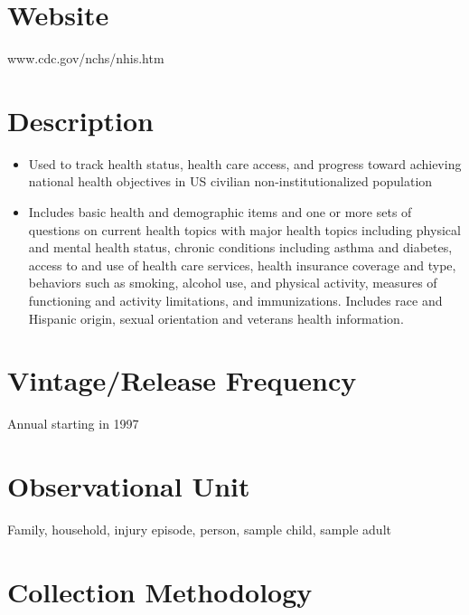 \documentclass[
]{book}
\providecommand{\tightlist}{%
  \setlength{\itemsep}{0pt}\setlength{\parskip}{0pt}}
\begin{document}
\hypertarget{website-50}{%
\section{Website}\label{website-50}}

www.cdc.gov/nchs/nhis.htm

\hypertarget{description-50}{%
\section{Description}\label{description-50}}

\begin{itemize}
\tightlist
\item
  Used to track health status, health care access, and progress toward achieving national health objectives in US civilian non-institutionalized population
\item
  Includes basic health and demographic items and one or more sets of questions on current health topics with major health topics including physical and mental health status, chronic conditions including asthma and diabetes, access to and use of health care services, health insurance coverage and type, behaviors such as smoking, alcohol use, and physical activity, measures of functioning and activity limitations, and immunizations. Includes race and Hispanic origin, sexual orientation and veterans health information.
\end{itemize}

\hypertarget{vintagerelease-frequency-50}{%
\section{Vintage/Release Frequency}\label{vintagerelease-frequency-50}}

Annual starting in 1997

\hypertarget{observational-unit-50}{%
\section{Observational Unit}\label{observational-unit-50}}

Family, household, injury episode, person, sample child, sample adult

\hypertarget{collection-methodology-50}{%
\section{Collection Methodology}\label{collection-methodology-50}}
\end{document}
